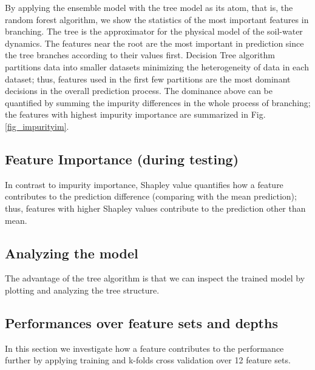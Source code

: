 \documentclass[twocolumn,3p,authoryear]{elsarticle}
\begin{document}
By applying the ensemble model with the tree model as its atom, that is, the random forest algorithm, we show the statistics of the most important features in branching.
The tree is the approximator for the physical model of the soil-water dynamics.
The features near the root are the most important in prediction since the tree branches according to their values first.
Decision Tree algorithm partitions data into smaller datasets minimizing the heterogeneity of data in each dataset; thus, features used in the first few partitions are the most dominant decisions in the overall prediction process.
The dominance above can be quantified by summing the impurity differences in the whole process of branching; the features with highest impurity importance are summarized in Fig. \ref{fig_impurityim}. %

\newpage


\subsection{Feature Importance (during testing)}

In contrast to impurity importance, Shapley value quantifies how a feature contributes to the prediction difference (comparing with the mean prediction); thus, features with higher Shapley values contribute to the prediction other than mean.




\newpage











\subsection{Analyzing the model}
The advantage of the tree algorithm is that we can inspect the trained model by plotting and analyzing the tree structure.

\newpage






\subsection{Performances over feature sets and depths}


In this section we investigate how a feature contributes to the performance further by applying training and k-folds cross validation over 12 feature sets.
\end{document}
